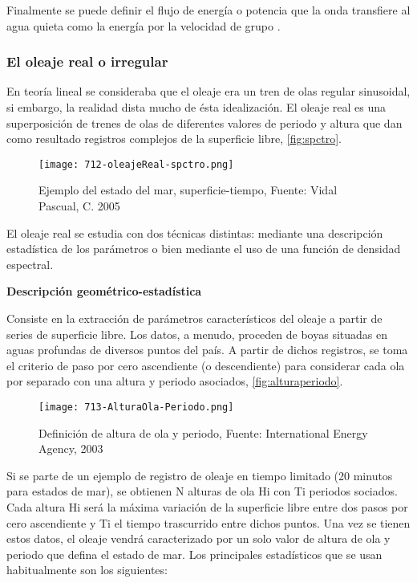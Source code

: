 Finalmente se puede definir el flujo de energía o potencia que la onda
transfiere al agua quieta como la energía por la velocidad de grupo \cite{fernandez13}.

\subsubsection{El oleaje real o irregular}\label{header-n286}

En teoría lineal se consideraba que el oleaje era un tren de olas
regular sinusoidal, si embargo, la realidad dista mucho de ésta
idealización. El oleaje real es una superposición de trenes de olas de
diferentes valores de periodo y altura que dan como resultado registros
complejos de la superficie libre, \autoref{fig:spctro}.

\begin{figure}
\centering
\texttt{[image: 712-oleajeReal-spctro.png]}
\caption[Ejemplo del estado del mar, superficie-tiempo]{Ejemplo del estado del mar, superficie-tiempo, Fuente: Vidal Pascual, C. 2005}
\label{fig:spctro}
\end{figure}

El oleaje real se estudia con dos técnicas distintas: mediante una
descripción estadística de los parámetros o bien mediante el uso de una
función de densidad espectral.

\textbf{Descripción geométrico-estadística}

Consiste en la extracción de parámetros característicos del oleaje a
partir de series de superficie libre. Los datos, a menudo, proceden de
boyas situadas en aguas profundas de diversos puntos del país. A partir
de dichos registros, se toma el criterio de paso por cero ascendiente (o
descendiente) para considerar cada ola por separado con una altura y
periodo asociados, \autoref{fig:alturaperiodo}.

\begin{figure}
\centering
\texttt{[image: 713-AlturaOla-Periodo.png]}
\caption[Altura de ola y periodo]{Definición de altura de ola y periodo, Fuente: International Energy Agency, 2003}
\label{fig:alturaperiodo}
\end{figure}

Si se parte de un ejemplo de registro de oleaje en tiempo limitado (20
minutos para estados de mar), se obtienen N alturas de ola Hi con Ti
periodos sociados. Cada altura Hi será la máxima variación de la
superficie libre entre dos pasos por cero ascendiente y Ti el tiempo
trascurrido entre dichos puntos. Una vez se tienen estos datos, el
oleaje vendrá caracterizado por un solo valor de altura de ola y periodo
que defina el estado de mar. Los principales estadísticos que se usan
habitualmente son los siguientes:


